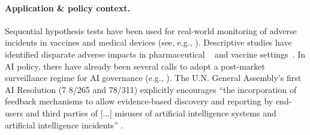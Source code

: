 \paragraph{Application \& policy context.} 
Sequential hypothesis tests have been used for real-world monitoring of adverse incidents in vaccines and medical devices (see, e.g., \cite{shimabukuro2015safety}).  Descriptive studies have identified disparate adverse impacts in pharmaceutical ~\citep{lee2023gender,whitley2009sex} and vaccine settings~\citep{oster2022myocarditis}. 
In AI policy, there have already been several calls to adopt a post-market surveillance regime for AI governance (e.g., \citet{raji2022outsider}).
The U.N. General Assembly's first AI Resolution (7 8/265 and 78/311) explicitly encourages ``the incorporation of feedback mechanisms to allow evidence-based discovery and reporting by end-users and third parties of 
[...]
misuses of artificial intelligence systems and artificial intelligence incidents'' 
\citep{un-ai-res}. %
